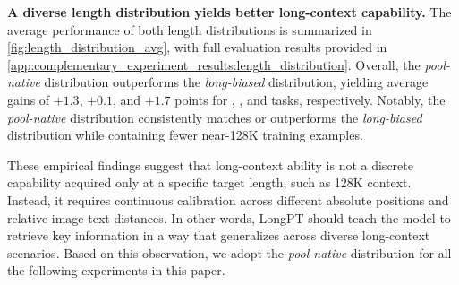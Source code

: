 \noindent\textbf{A diverse length distribution yields better long-context capability.}
The average performance of both length distributions is summarized in \cref{fig:length_distribution_avg}, with full evaluation results provided in \cref{app:complementary_experiment_results:length_distribution}.
Overall, the \emph{pool-native} distribution outperforms the \emph{long-biased} distribution, yielding average gains of $+1.3$, $+0.1$, and $+1.7$ points for \extractsingle, \extractmulti, and \reasoningtask tasks, respectively.
Notably, the \emph{pool-native} distribution consistently matches or outperforms the \emph{long-biased} distribution while containing fewer near-128K training examples.

These empirical findings suggest that long-context ability is not a discrete capability acquired only at a specific target length, such as 128K context.
Instead, it requires continuous calibration across different absolute positions and relative image-text distances.
In other words, LongPT should teach the model to retrieve key information in a way that generalizes across diverse long-context scenarios.
Based on this observation, we adopt the \emph{pool-native} distribution for all the following experiments in this paper.

